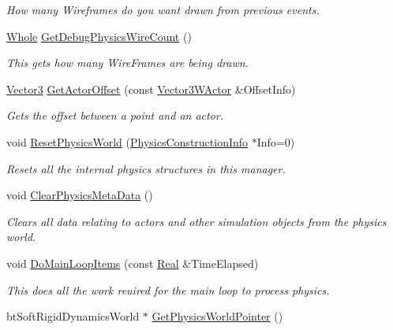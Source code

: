 \begin{DoxyCompactItemize}
\begin{DoxyCompactList}\small\item\em How many Wireframes do you want drawn from previous events. \item\end{DoxyCompactList}\item 
\hyperlink{namespacephys_a460f6bc24c8dd347b05e0366ae34f34a}{Whole} \hyperlink{classphys_1_1PhysicsManager_a8f46e55e4cadfcd1c2c03bcdbfe6c06f}{GetDebugPhysicsWireCount} ()
\begin{DoxyCompactList}\small\item\em This gets how many WireFrames are being drawn. \item\end{DoxyCompactList}\item 
\hyperlink{classphys_1_1Vector3}{Vector3} \hyperlink{classphys_1_1PhysicsManager_a54a48fdfd9db914c25a0f892c2f56301}{GetActorOffset} (const \hyperlink{classphys_1_1Vector3WActor}{Vector3WActor} \&OffsetInfo)
\begin{DoxyCompactList}\small\item\em Gets the offset between a point and an actor. \item\end{DoxyCompactList}\item 
void \hyperlink{classphys_1_1PhysicsManager_a22e76681b153c170dd6bfef2edbbbcd3}{ResetPhysicsWorld} (\hyperlink{classphys_1_1PhysicsConstructionInfo}{PhysicsConstructionInfo} $\ast$Info=0)
\begin{DoxyCompactList}\small\item\em Resets all the internal physics structures in this manager. \item\end{DoxyCompactList}\item 
void \hyperlink{classphys_1_1PhysicsManager_aa9f964240e51a92abf0afbb045721396}{ClearPhysicsMetaData} ()
\begin{DoxyCompactList}\small\item\em Clears all data relating to actors and other simulation objects from the physics world. \item\end{DoxyCompactList}\item 
void \hyperlink{classphys_1_1PhysicsManager_ad363d6683a0276395eeb2c42a56f95fc}{DoMainLoopItems} (const \hyperlink{namespacephys_af7eb897198d265b8e868f45240230d5f}{Real} \&TimeElapsed)
\begin{DoxyCompactList}\small\item\em This does all the work reuired for the main loop to process physics. \item\end{DoxyCompactList}\item 
\hypertarget{classphys_1_1PhysicsManager_a4b4f8a23259a94a50c81649f39256d7f}{
btSoftRigidDynamicsWorld $\ast$ \hyperlink{classphys_1_1PhysicsManager_a4b4f8a23259a94a50c81649f39256d7f}{GetPhysicsWorldPointer} ()}
\label{classphys_1_1PhysicsManager_a4b4f8a23259a94a50c81649f39256d7f}


\end{DoxyCompactItemize}
